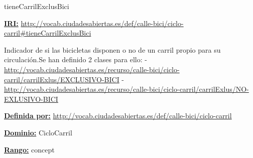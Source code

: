 \begin{mybox}{tieneCarrilExclusBici}
\begin{flushleft}
\underline{\textbf{IRI:}}
\url{http://vocab.ciudadesabiertas.es/def/calle-bici/ciclo-carril#tieneCarrilExclusBici}
\newline

Indicador de si las bicicletas disponen o no de un carril propio para su circulación.Se han definido 2 clases para ello:
\newline -	\url{http://vocab.ciudadesabiertas.es/recurso/calle-bici/ciclo-carril/carrilExlus/EXCLUSIVO-BICI}
\newline -	 \url{http://vocab.ciudadesabiertas.es/recurso/calle-bici/ciclo-carril/carrilExlus/NO-EXLUSIVO-BICI}
\newline


\underline{\textbf{Definida por:}}
\url{http://vocab.ciudadesabiertas.es/def/calle-bici/ciclo-carril}
\newline

\underline{\textbf{Dominio:}}
	CicloCarril
\newline

\underline{\textbf{Rango:}}
	concept
\newline

\end{flushleft}
\end{mybox}







